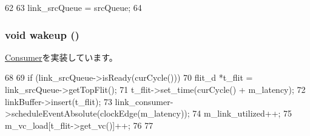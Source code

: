 \begin{DoxyCode}
62 {
63     link_srcQueue = srcQueue;
64 }
\end{DoxyCode}
\hypertarget{classNetworkLink__d_ae674290a26ecbd622c5160e38e8a4fe9}{
\subsubsection[{wakeup}]{\setlength{\rightskip}{0pt plus 5cm}void wakeup ()}}
\label{classNetworkLink__d_ae674290a26ecbd622c5160e38e8a4fe9}


\hyperlink{classConsumer_a623e3e7d1b1c725d70009f7b01a421b9}{Consumer}を実装しています。


\begin{DoxyCode}
68 {
69     if (link_srcQueue->isReady(curCycle())) {
70         flit_d *t_flit = link_srcQueue->getTopFlit();
71         t_flit->set_time(curCycle() + m_latency);
72         linkBuffer->insert(t_flit);
73         link_consumer->scheduleEventAbsolute(clockEdge(m_latency));
74         m_link_utilized++;
75         m_vc_load[t_flit->get_vc()]++;
76     }
77 }
\end{DoxyCode}


